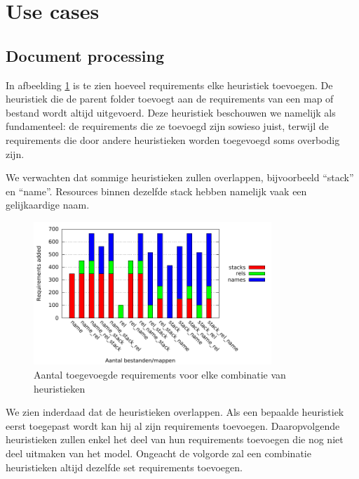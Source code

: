 \section{Use cases}

\subsection{Document processing}


In afbeelding \ref{fig:reqs} is te zien hoeveel requirements elke heuristiek toevoegen.
De heuristiek die de parent folder toevoegt aan de requirements van een map of bestand wordt altijd uitgevoerd.
Deze heuristiek beschouwen we namelijk als fundamenteel: de requirements die ze toevoegd zijn sowieso juist, terwijl de requirements die door andere heuristieken worden toegevoegd soms overbodig zijn. 

We verwachten dat sommige heuristieken zullen overlappen, bijvoorbeeld ``stack'' en ``name''. 
Resources binnen dezelfde stack hebben namelijk vaak een gelijkaardige naam. 

\begin{figure}[h]
    \begin{center}
    \includegraphics[width=0.8\textwidth]{images/reqs.pdf}
    \caption{Aantal toegevoegde requirements voor elke combinatie van heuristieken}
    \label{fig:reqs}
    \end{center}
\end{figure}

We zien inderdaad dat de heuristieken overlappen.
Als een bepaalde heuristiek eerst toegepast wordt kan hij al zijn requirements toevoegen.
Daaropvolgende heuristieken zullen enkel het deel van hun requirements toevoegen die nog niet deel uitmaken van het model.
Ongeacht de volgorde zal een combinatie heuristieken altijd dezelfde set requirements toevoegen.

